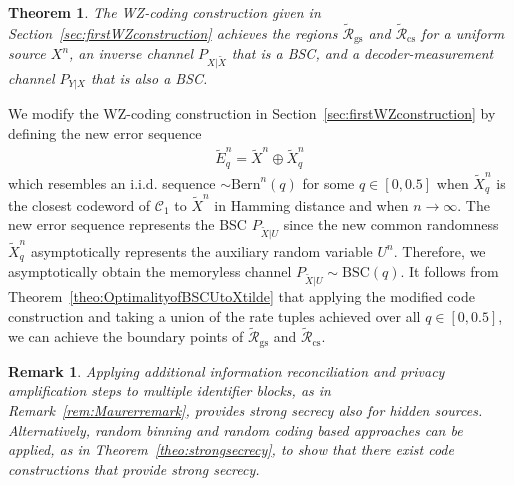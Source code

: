 \documentclass[journal,10pt,twoside]{IEEEtran}
\newcommand*\xor{\mathbin{\oplus}}
\newtheorem{theorem}{Theorem}
\newtheorem{remark}{Remark}
\begin{document}
\begin{theorem}
	The WZ-coding construction given in Section~\ref{sec:firstWZconstruction} achieves the regions $\displaystyle \widetilde{\mathcal{R}}_{\text{gs}}$ and $\displaystyle \widetilde{\mathcal{R}}_{\text{cs}}$ for a uniform source $X^n$, an inverse channel $P_{X|\widetilde{X}}$ that is a BSC, and a decoder-measurement channel $\displaystyle P_{Y|X}$ that is also a BSC.
\end{theorem}

\begin{IEEEproof}
	We modify the WZ-coding construction in Section~\ref{sec:firstWZconstruction} by defining the new error sequence 
	\begin{align}
	\widetilde{E}_q^n = \widetilde{X}^n\xor \widetilde{X}_{q}^n\label{eq:newerrorsequence}
	\end{align}
	which resembles an i.i.d. sequence $\sim \text{Bern}^n(q)$ for some $q\in[0,0.5]$ when $\widetilde{X}_q^n$ is the closest codeword of $\mathcal{C}_1$ to $\widetilde{X}^n$ in Hamming distance and when $n\rightarrow\infty$. The new error sequence represents the BSC $\displaystyle P_{\widetilde{X}|U}$ since the new common randomness $\widetilde{X}_q^n$ asymptotically represents the auxiliary random variable $U^n$. Therefore, we asymptotically obtain the memoryless channel $\displaystyle P_{\widetilde{X}|U}\sim \text{BSC}(q)$. It follows from Theorem~\ref{theo:OptimalityofBSCUtoXtilde} that applying the modified code construction and taking a union of the rate tuples achieved over all $q\in[0, 0.5]$, we can achieve the boundary points of $\displaystyle \widetilde{\mathcal{R}}_{\text{gs}}$ and $\displaystyle \widetilde{\mathcal{R}}_{\text{cs}}$. 
\end{IEEEproof}

\begin{remark}
	Applying additional information reconciliation and privacy amplification steps to multiple identifier blocks, as in Remark~\ref{rem:Maurerremark}, provides strong secrecy also for hidden sources. Alternatively, random binning and random coding based approaches can be applied, as in Theorem~\ref{theo:strongsecrecy}, to show that there exist code constructions that provide strong secrecy. 
\end{remark}


\ifCLASSOPTIONcaptionsoff
\newpage
\fi




\end{document}
